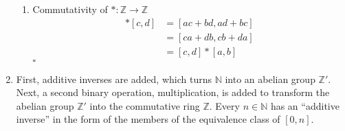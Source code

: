 \documentclass{article}
\begin{document}
\begin{enumerate}[label=\textbf{(\alph*)}]
{\begin{enumerate}[label=(\arabic*)]
{\begin{align*}
				&= [a,b]*[ce+df,cf+de]\\
				&= [a,b]*([c,d]*[e,f])
		\end{align*}
	}
	\item{
		Commutativity of $*:\mathbb{Z}\to\mathbb{Z}$
		\begin{align*}
			[a,b]*[c,d] &= [ac+bd,ad+bc] \\
				&= [ca+db,cb+da] \\
				&= [c,d]*[a,b]
		\end{align*}
	}
	\hfill $\square$
	\end{enumerate}
}
\item{
	First, additive inverses are added, which turns
	$\mathbb{N}$ into an abelian group $\mathbb{Z}'$.
	Next, a second binary operation, multiplication, is
	added to transform the abelian group
	$\mathbb{Z}'$ into the commutative ring $\mathbb{Z}$.
	Every $n\in\mathbb{N}$ has an ``additive inverse''
	in the form of the members of the equivalence class of $[0,n]$.
}
\end{enumerate}

\vfill
\end{document}
